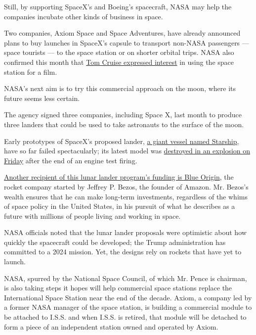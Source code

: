 Still, by supporting SpaceX's and Boeing's spacecraft, NASA may help the
companies incubate other kinds of business in space.

Two companies, Axiom Space and Space Adventures, have already announced
plans to buy launches in SpaceX's capsule to transport non-NASA
passengers --- space tourists --- to the space station or on shorter
orbital trips. NASA also confirmed this month that
\href{https://www.nytimes.com/2020/05/05/science/nasa-tom-cruise-space-station.html}{Tom
Cruise expressed interest} in using the space station for a film.

NASA's next aim is to try this commercial approach on the moon, where
its future seems less certain.

The agency signed three companies, including Space X, last month to
produce three landers that could be used to take astronauts to the
surface of the moon.

Early prototypes of SpaceX's proposed lander,
\href{https://www.nytimes.com/2019/09/29/science/elon-musk-spacex-starship.html}{a
giant vessel named Starship}, have so far failed spectacularly; its
latest model was
\href{https://www.valleycentral.com/news/explosion-at-spacex-south-texas-facility-caught-on-camera/}{destroyed
in an explosion on Friday} after the end of an engine test firing.

\href{https://www.nytimes.com/2020/04/30/science/nasa-moon-lander.html}{Another
recipient of this lunar lander program's funding is Blue Origin}, the
rocket company started by Jeffrey P. Bezos, the founder of Amazon. Mr.
Bezos's wealth ensures that he can make long-term investments,
regardless of the whims of space policy in the United States, in his
pursuit of what he describes as a future with millions of people living
and working in space.

NASA officials noted that the lunar lander proposals were optimistic
about how quickly the spacecraft could be developed; the Trump
administration has committed to a 2024 mission. Yet, the designs rely on
rockets that have yet to launch.

NASA, spurred by the National Space Council, of which Mr. Pence is
chairman, is also taking steps it hopes will help commercial space
stations replace the International Space Station near the end of the
decade. Axiom, a company led by a former NASA manager of the space
station, is building a commercial module to be attached to I.S.S. and
when I.S.S. is retired, that module will be detached to form a piece of
an independent station owned and operated by Axiom.


